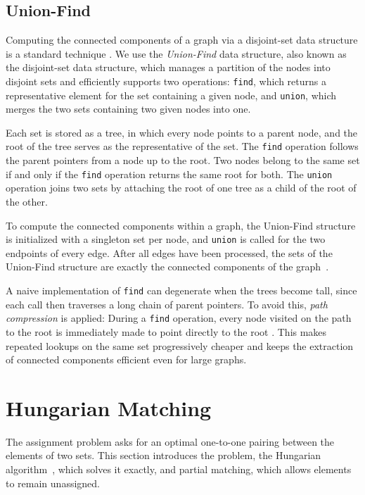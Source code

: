\documentclass[english, egger, bsc]{vcethesis}
\begin{document}
\subsection{Union-Find}
\label{sec:union_find}
Computing the connected components of a graph via a disjoint-set data structure is a standard technique \cite{cormen2009algorithms}. We use the \emph{Union-Find} data structure, also known as the disjoint-set data structure, which manages a partition of the nodes into disjoint sets and efficiently supports two operations: \texttt{find}, which returns a representative element for the set containing a given node, and \texttt{union}, which merges the two sets containing two given nodes into one.

Each set is stored as a tree, in which every node points to a parent node, and the root of the tree serves as the representative of the set. The \texttt{find} operation follows the parent pointers from a node up to the root. Two nodes belong to the same set if and only if the \texttt{find} operation returns the same root for both. The \texttt{union} operation joins two sets by attaching the root of one tree as a child of the root of the other.

To compute the connected components within a graph, the Union-Find structure is initialized with a singleton set per node, and \texttt{union} is called for the two endpoints of every edge. After all edges have been processed, the sets of the Union-Find structure are exactly the connected components of the graph~\cite{cormen2009algorithms}.

A naive implementation of \texttt{find} can degenerate when the trees become tall, since each call then traverses a long chain of parent pointers. To avoid this, \emph{path compression} is applied: During a \texttt{find} operation, every node visited on the path to the root is immediately made to point directly to the root \cite{cormen2009algorithms}. This makes repeated lookups on the same set progressively cheaper and keeps the extraction of connected components efficient even for large graphs.

\section{Hungarian Matching}
\label{sec:hungarian}
The assignment problem asks for an optimal one-to-one pairing between the elements of two sets. This section introduces the problem, the Hungarian algorithm~\cite{kuhn1955hungarian, munkres1957algorithms}, which solves it exactly, and partial matching, which allows elements to remain unassigned.
\end{document}
